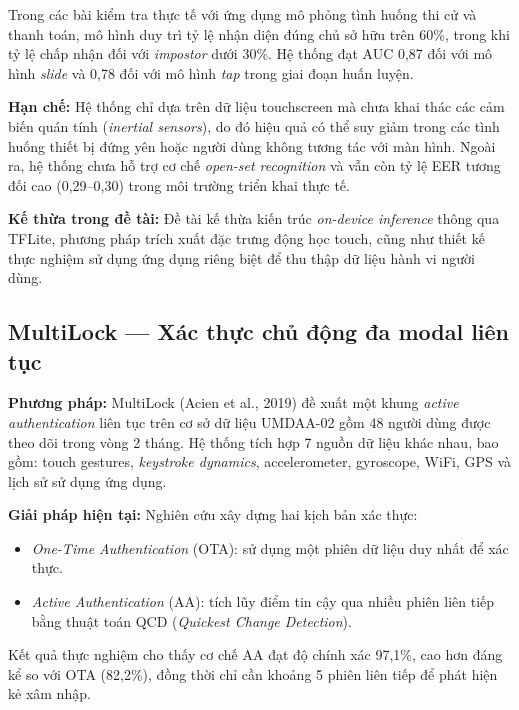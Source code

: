 \documentclass[../DoAn.tex]{subfiles}
\begin{document}
    Trong các bài kiểm tra thực tế với ứng dụng mô phỏng tình huống thi cử và thanh toán, mô hình duy trì tỷ lệ nhận diện đúng chủ sở hữu trên 60\%, trong khi tỷ lệ chấp nhận đối với \textit{impostor} dưới 30\%. Hệ thống đạt AUC 0,87 đối với mô hình \textit{slide} và 0,78 đối với mô hình \textit{tap} trong giai đoạn huấn luyện.
    
    \textbf{Hạn chế:} Hệ thống chỉ dựa trên dữ liệu touchscreen mà chưa khai thác các cảm biến quán tính (\textit{inertial sensors}), do đó hiệu quả có thể suy giảm trong các tình huống thiết bị đứng yên hoặc người dùng không tương tác với màn hình. Ngoài ra, hệ thống chưa hỗ trợ cơ chế \textit{open-set recognition} và vẫn còn tỷ lệ EER tương đối cao (0,29--0,30) trong môi trường triển khai thực tế.
    
    \textbf{Kế thừa trong đề tài:} Đề tài kế thừa kiến trúc \textit{on-device inference} thông qua TFLite, phương pháp trích xuất đặc trưng động học touch, cũng như thiết kế thực nghiệm sử dụng ứng dụng riêng biệt để thu thập dữ liệu hành vi người dùng.
    
    \subsection{MultiLock --- Xác thực chủ động đa modal liên tục}

    \textbf{Phương pháp:} MultiLock (Acien et al., 2019) đề xuất một khung \textit{active authentication} liên tục trên cơ sở dữ liệu UMDAA-02 gồm 48 người dùng được theo dõi trong vòng 2 tháng. Hệ thống tích hợp 7 nguồn dữ liệu khác nhau, bao gồm: touch gestures, \textit{keystroke dynamics}, accelerometer, gyroscope, WiFi, GPS và lịch sử sử dụng ứng dụng.
    
    \textbf{Giải pháp hiện tại:} Nghiên cứu xây dựng hai kịch bản xác thực:
    \begin{itemize}
        \item \textit{One-Time Authentication} (OTA): sử dụng một phiên dữ liệu duy nhất để xác thực.
        
        \item \textit{Active Authentication} (AA): tích lũy điểm tin cậy qua nhiều phiên liên tiếp bằng thuật toán QCD (\textit{Quickest Change Detection}).
    \end{itemize}
    
    Kết quả thực nghiệm cho thấy cơ chế AA đạt độ chính xác 97,1\%, cao hơn đáng kể so với OTA (82,2\%), đồng thời chỉ cần khoảng 5 phiên liên tiếp để phát hiện kẻ xâm nhập.
    
\end{document}
